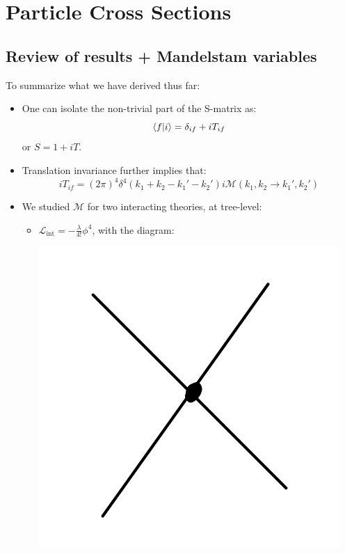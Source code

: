 \section{Particle Cross Sections}
\subsection{Review of results + Mandelstam variables}
To summarize what we have derived thus far:
\begin{itemize}
    \item One can isolate the non-trivial part of the S-matrix as:
    \begin{equation}
        \langle f \lvert i \rangle = \delta_{if} + iT_{if}
    \end{equation}
    or $S = 1 + iT$.
    \item Translation invariance further implies that:
    \begin{equation}
        iT_{if} = (2\pi)^4\delta^4(k_1 + k_2 - k_1' - k_2')i\mathcal{M}(k_1, k_2 \to k_1', k_2')
    \end{equation}
    \item We studied $\mathcal{M}$ for two interacting theories, at tree-level:
    \begin{itemize}
        \item $\mathcal{L}_{\text{int}} = -\frac{\lambda}{4!}\phi^4$, with the diagram:
        \begin{center}
            \includegraphics[scale=0.4]{Lectures/Figures/lec18-Olambda.png}

\end{center}
\end{itemize}
\end{itemize}
